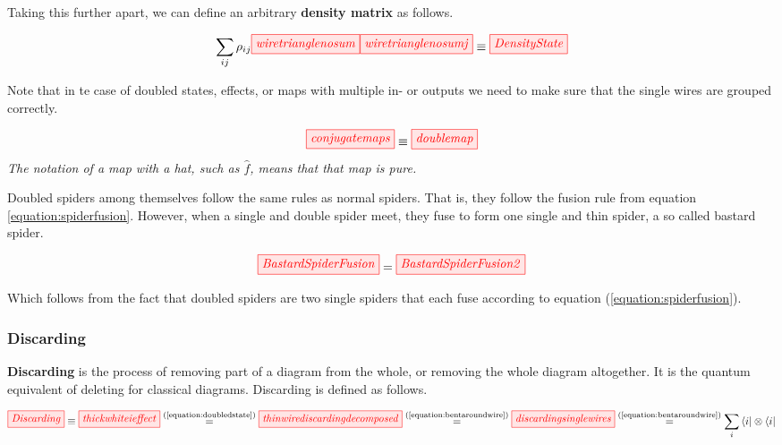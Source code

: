 \documentclass[]{article}
\newcommand{\equaltext}[1]{\ensuremath{\stackrel{\text{#1}}{=}}}
\begin{document}
Taking this further apart, we can define an arbitrary \textbf{density matrix} as follows.

\begin{equation}
	\label{equation:densitymatrix}
	 \sum\limits_{ij} \rho_{ij} \tikzfig{wiretrianglenosum} \tikzfig{wiretrianglenosumj} \equiv \tikzfig{DensityState}
\end{equation}

Note that in te case of doubled states, effects, or maps with multiple in- or outputs we need to make sure that the single wires are grouped correctly.

\begin{equation}
\label{equation:conjugatemaps}
\tikzfig{conjugatemaps} \equiv \tikzfig{doublemap}
\end{equation}
\textit{The notation of a map with a hat, such as $\hat{f}$, means that that map is pure.}

Doubled spiders among themselves follow the same rules as normal spiders. That is, they follow the fusion rule from equation \ref{equation:spiderfusion}. However, when a single and double spider meet, they fuse to form one single and thin spider, a so called bastard spider.

\begin{equation}
\label{equation:bastardspiderfusion}
	\tikzfig{BastardSpiderFusion} = \tikzfig{BastardSpiderFusion2}
\end{equation}

Which follows from the fact that doubled spiders are two single spiders that each fuse according to equation (\ref{equation:spiderfusion}).
\subsubsection{Discarding}
\label{discarding}

\textbf{Discarding} is the process of removing part of a diagram from the whole, or removing the whole diagram altogether. It is the quantum equivalent of deleting for classical diagrams. Discarding is defined as follows.

\begin{equation}
\label{equation:discarding}
\tikzfig{Discarding} \equiv \tikzfig{thickwhiteieffect} \equaltext{(\ref{equation:doubledstate})} \tikzfig{thinwirediscardingdecomposed} 
\equaltext{(\ref{equation:bentaroundwire})}
 \tikzfig{discardingsinglewires} \equaltext{(\ref{equation:bentaroundwire})} \sum\limits_{i}\bra{i}\otimes\bra{i}
\end{equation}
\end{document}
